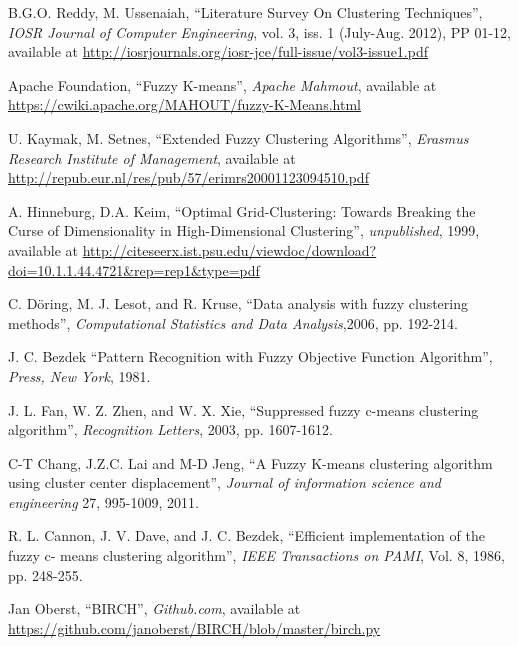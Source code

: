 \documentclass[conference, 10pt]{IEEEtran}
\begin{document}
\begin{thebibliography}{1}
   B.G.O. Reddy, M. Ussenaiah, ``Literature Survey On Clustering Techniques'', \emph{IOSR Journal of Computer Engineering}, vol. 3, iss. 1 (July-Aug. 2012), PP 01-12, available at
  \url{http://iosrjournals.org/iosr-jce/full-issue/vol3-issue1.pdf}

   Apache Foundation, ``Fuzzy K-means'', \emph{Apache Mahmout}, available at
  \url{https://cwiki.apache.org/MAHOUT/fuzzy-K-Means.html}

   U. Kaymak, M. Setnes, ``Extended Fuzzy Clustering Algorithms'', \emph{Erasmus Research Institute of Management}, available at
  \url{http://repub.eur.nl/res/pub/57/erimrs20001123094510.pdf}

   A. Hinneburg, D.A. Keim, ``Optimal Grid-Clustering: Towards Breaking the Curse of Dimensionality in High-Dimensional Clustering'', \emph{unpublished}, 1999, available at
  \url{http://citeseerx.ist.psu.edu/viewdoc/download?doi=10.1.1.44.4721&rep=rep1&type=pdf}  

                                               
   C. Döring, M. J. Lesot, and R. Kruse, ``Data analysis with fuzzy clustering methods'', \emph{Computational Statistics and Data Analysis},2006, pp. 192-214.

   J. C. Bezdek ``Pattern Recognition with Fuzzy Objective Function Algorithm'', \emph{Press, New York}, 1981.

   J. L. Fan, W. Z. Zhen, and W. X. Xie, ``Suppressed fuzzy c-means clustering algorithm'', \emph{ Recognition Letters}, 2003, pp. 1607-1612.

   C-T Chang, J.Z.C. Lai and M-D Jeng, ``A Fuzzy K-means clustering algorithm  using cluster center displacement'', \emph{Journal of information science and engineering} 27, 995-1009, 2011.

   R. L. Cannon, J. V. Dave, and J. C. Bezdek, ``Efficient implementation of the fuzzy c- means clustering algorithm'', \emph{IEEE Transactions on PAMI}, Vol. 8, 1986, pp. 248-255.

   Jan Oberst, ``BIRCH'', \emph{Github.com}, available at
  \url{https://github.com/janoberst/BIRCH/blob/master/birch.py}

  \end{thebibliography}

  
\end{document}

